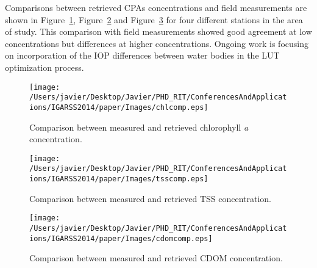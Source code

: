 Comparisons between retrieved CPAs concentrations and field measurements are shown in Figure~\ref{fig:chlcomp}, Figure~\ref{fig:tsscomp} and Figure~\ref{fig:cdomcomp} for four different stations in the area of study. This comparison with field measurements showed good agreement at low concentrations but differences at higher concentrations. Ongoing work is focusing on incorporation of the IOP differences between water bodies in the LUT optimization process.
\begin{figure}[htb]
\centering
    \texttt{[image: /Users/javier/Desktop/Javier/PHD\_RIT/ConferencesAndApplications/IGARSS2014/paper/Images/chlcomp.eps]} 
    \caption{Comparison between measured and retrieved chlorophyll {\it a} concentration.}
    \label{fig:chlcomp} 
\end{figure}     

\begin{figure}[htb]
\centering
    \texttt{[image: /Users/javier/Desktop/Javier/PHD\_RIT/ConferencesAndApplications/IGARSS2014/paper/Images/tsscomp.eps]}   
    \caption{Comparison between measured and retrieved TSS concentration.}
    \label{fig:tsscomp} 
\end{figure}  

\begin{figure}[htb]
\centering
    \texttt{[image: /Users/javier/Desktop/Javier/PHD\_RIT/ConferencesAndApplications/IGARSS2014/paper/Images/cdomcomp.eps]}    
    \caption{Comparison between measured and retrieved CDOM concentration.}
    \label{fig:cdomcomp} 
\end{figure}  

